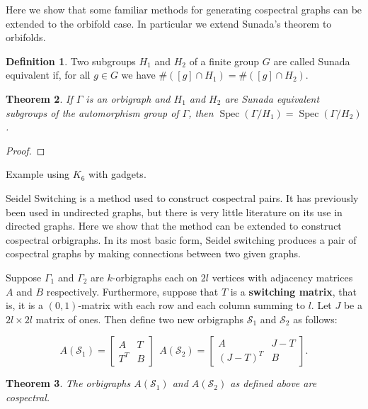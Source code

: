 \documentclass[12pt]{article}
\theoremstyle{plain}
\newtheorem{theorem}{Theorem}
\theoremstyle{definition}
\newtheorem{definition}[theorem]{Definition}
\theoremstyle{remark}
\DeclareMathOperator*{\spec}{Spec}
\begin{document}
  Here we show that some familiar methods for generating cospectral graphs can be extended to the orbifold case. In particular we extend Sunada's theorem to orbifolds.

  \begin{definition}\label{def:SunadaEquivalentDefn}
    Two subgroups $H_1$ and $H_2$  of a finite group $G$ are called Sunada equivalent if, for all $g \in G$ we have $\#([g] \cap H_1) = \#([g] \cap H_2)$.
  \end{definition}

  \begin{theorem}\label{thm:Sunada}
    If $\Gamma$ is an orbigraph and $H_1$ and $H_2$ are Sunada equivalent subgroups of the automorphism group of $\Gamma$, then $\spec(\Gamma / H_1) = \spec(\Gamma / H_2)$.
  \end{theorem}
  \begin{proof}
    
  \end{proof}

  Example using $K_6$ with gadgets.

  Seidel Switching is a method used to construct cospectral pairs. It has previously been used in undirected graphs, but there is very little literature on its use in directed graphs. Here we show that the method can be extended to construct cospectral orbigraphs. In its most basic form, Seidel switching produces a pair of cospectral graphs by making connections between two given graphs. 

  Suppose $\Gamma_1$ and $\Gamma_2$ are $k$-orbigraphs each on $2l$ vertices with adjacency matrices $A$ and $B$ respectively. Furthermore, suppose that $T$ is a \textbf{switching matrix}, that is, it is a $(0,1)$-matrix with each row and each column summing to $l$. Let $J$ be a $2l \times 2l$ matrix of ones. Then define two new orbigraphs $\mathcal{S}_1$ and $\mathcal{S}_2$ as follows:

  $$
  A(\mathcal{S}_1) = \begin{bmatrix}
      A & T \\
      T^T & B
  \end{bmatrix} \ \ 
  A(\mathcal{S}_2) = \begin{bmatrix}
      A & J - T \\
      (J - T)^T & B
  \end{bmatrix}.
  $$

  \begin{theorem}\label{thm:SeidelSwitchingSimple}
  The orbigraphs $A(\mathcal{S}_1)$ and $A(\mathcal{S}_2)$ as defined above are cospectral.
  \end{theorem}
\end{document}
